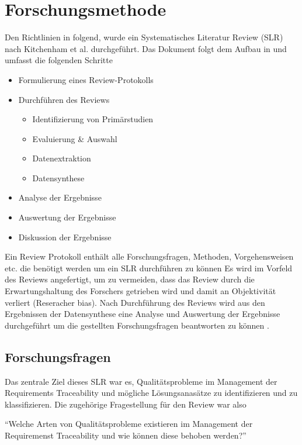 \section{Forschungsmethode}
\label{sec:Forschungsmethode}
Den Richtlinien in \cite{Keele2007GuidelinesEngineering} folgend, wurde ein Systematisches Literatur Review (SLR) nach Kitchenham et al. durchgeführt. Das Dokument folgt dem Aufbau in \cite{Walia2009AErrors} und umfasst die folgenden Schritte 

\begin{itemize}
    \item Formulierung eines Review-Protokolls
    \item Durchführen des Reviews
        \begin{itemize}
            \item Identifizierung von Primärstudien
            \item Evaluierung \& Auswahl
            \item Datenextraktion
            \item Datensynthese
        \end{itemize}
    \item Analyse der Ergebnisse
    \item Auswertung der Ergebnisse
    \item Diskussion der Ergebnisse
\end{itemize}

Ein Review Protokoll enthält alle Forschungsfragen, Methoden, Vorgehensweisen etc. die benötigt werden um ein SLR durchführen zu können Es wird im Vorfeld des Reviews angefertigt, um zu vermeiden, dass das Review durch die Erwartungshaltung des Forschers getrieben wird und damit an Objektivität verliert (Reseracher bias). Nach Durchführung des Reviews wird aus den Ergebnissen der Datensynthese eine Analyse und Auswertung der Ergebnisse durchgeführt um die gestellten Forschungsfragen beantworten zu können \cite{Walia2009AErrors}.

\subsection{Forschungsfragen}

Das zentrale Ziel dieses SLR war es, Qualitätsprobleme im Management der Requirements Traceability und mögliche Lösungsanasätze zu identifizieren und zu klassifizieren. Die zugehörige Fragestellung für den Review war also

\enquote{Welche Arten von Qualitätsprobleme existieren im Management der Requiremenst Traceability und wie können diese behoben werden?}

